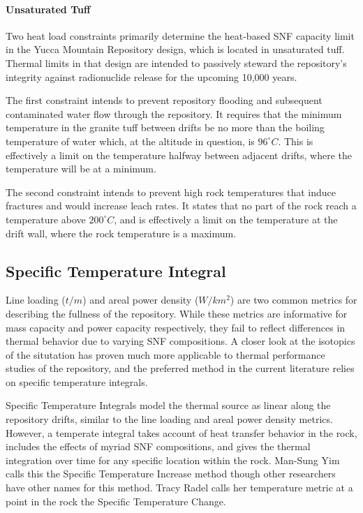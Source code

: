 \paragraph{Unsaturated Tuff}

Two heat load constraints primarily determine the heat-based SNF capacity limit in the Yucca 
Mountain Repository design, which is located in unsaturated tuff. Thermal limits in that design are intended to passively steward 
the repository's integrity against radionuclide release for the upcoming 10,000 years.

The first constraint intends to prevent repository flooding and subsequent contaminated water flow 
through the repository. It requires that the minimum temperature in the granite tuff between drifts 
be no more than the boiling temperature of water which, at the altitude in question, is 
$96^{\circ}C$. This is effectively a limit on the temperature halfway between adjacent drifts, where 
the temperature will be at a minimum.

The second constraint intends to prevent high rock temperatures that induce fractures and would 
increase leach rates. It states that no part of the rock reach a temperature above $200^{\circ}C$, 
and is effectively a limit on the temperature at the drift wall, where the rock temperature is a 
maximum.  

\subsection{Specific Temperature Integral}

Line loading ($t/m$) and areal power density ($W/km^2$) are two common metrics for describing the 
fullness of the repository. While these metrics are informative for mass capacity and power capacity 
respectively, they fail to reflect differences in thermal behavior due to varying SNF compositions.  
A closer look at the isotopics of the situtation has proven much more applicable to thermal 
performance studies of the repository, and the preferred method in the current literature relies on 
specific temperature integrals.


Specific Temperature Integrals model the thermal source as linear along the repository 
drifts, similar to the line loading and areal power density metrics. However, a temperate integral 
takes account of heat transfer behavior in the rock, includes the effects of myriad SNF 
compositions, and gives the thermal integration over time for any specific location within the rock.  
Man-Sung Yim calls this the Specific Temperature Increase method\cite{YimSTI} though other 
researchers have other names for this method. Tracy Radel calls her temperature metric at a point in 
the rock the Specific Temperature Change.\cite{radel_repository_2007}

